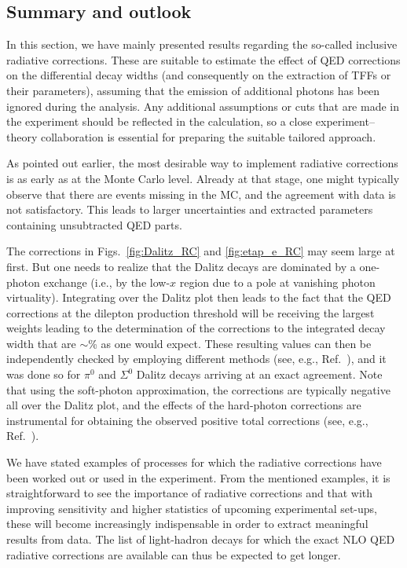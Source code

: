 \subsection{Summary and outlook}

In this section, we have mainly presented results regarding the so-called inclusive radiative corrections.
These are suitable to estimate the effect of QED corrections on the differential decay widths (and consequently on the extraction of TFFs or their parameters), assuming that the emission of additional photons has been ignored during the analysis.
Any additional assumptions or cuts that are made in the experiment should be reflected in the calculation, so a close experiment--theory collaboration is essential for preparing the suitable tailored approach.

As pointed out earlier, the most desirable way to implement radiative corrections is as early as at the Monte Carlo level.
Already at that stage, one might typically observe that there are events missing in the MC, and the agreement with data is not satisfactory.
This leads to larger uncertainties and extracted parameters containing unsubtracted QED parts.

The corrections in Figs.~\ref{fig:Dalitz_RC} and \ref{fig:etap_e_RC} may seem large at first.
But one needs to realize that the Dalitz decays are dominated by a one-photon exchange (i.e., by the low-$x$ region due to a pole at vanishing photon virtuality).
Integrating over the Dalitz plot then leads to the fact that the QED corrections at the dilepton production threshold will be receiving the largest weights leading to the determination of the corrections to the integrated decay width that are $\sim$\% as one would expect.
These resulting values can then be independently checked by employing different methods (see, e.g., Ref.~\cite{Lautrup:1971ew}), and it was done so for $\pi^0$ and $\Sigma^0$ Dalitz decays arriving at an exact agreement.
Note that using the soft-photon approximation, the corrections are typically negative all over the Dalitz plot, and the effects of the hard-photon corrections are instrumental for obtaining the observed positive total corrections (see, e.g., Ref.~\cite{Sidhu:1971myo}).

We have stated examples of processes for which the radiative corrections have been worked out or used in the experiment.
From the mentioned examples, it is straightforward to see the importance of radiative corrections and that with improving sensitivity and higher statistics of upcoming experimental set-ups, these will become increasingly indispensable in order to extract meaningful results from data.
The list of light-hadron decays for which the exact NLO QED radiative corrections are available can thus be expected to get longer.